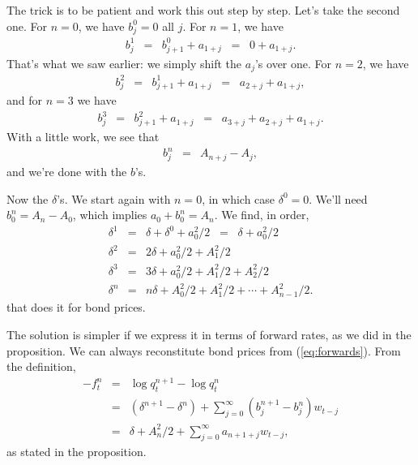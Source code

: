 \documentclass[11pt]{article}
\begin{document}
The trick is to be patient and work this out step by step.
Let's take the second one.
For $n = 0$,  we have $b^0_j = 0$ all $j$.
For $n=1$, we have
\begin{eqnarray*}
    b^1_j &=& b^0_{j+1} + a_{1+j}
            \;\;=\;\; 0 + a_{1+j}.
\end{eqnarray*}
That's what we saw earlier:  we simply shift the $a_j$'s over one.
For $n=2$, we have
\begin{eqnarray*}
    b^2_j &=& b^1_{j+1} + a_{1+j}
            \;\;=\;\; a_{2+j} + a_{1+j} ,
\end{eqnarray*}
and for $n=3$ we have
\begin{eqnarray*}
    b^3_j &=& b^2_{j+1} + a_{1+j}
            \;\;=\;\; a_{3+j} + a_{2+j} + a_{1+j} .
\end{eqnarray*}
With a little work, we see that
\begin{eqnarray*}
    b^n_j &=& A_{n+j} - A_j  ,
\end{eqnarray*}
and we're done with the $b$'s.

Now the $\delta$'s.
We start again with $n=0$, in which case $\delta^0 = 0$.
We'll need $b^n_0 = A_{n} - A_0 $,
which implies $a_0 + b^n_0 = A_n$.
We find, in order,
\begin{eqnarray*}
    \delta^1 &=& \delta + \delta^0 + a_0^2/2
            \;\;=\;\; \delta + a_0^2/2 \\
    \delta^2 &=& 2 \delta + a_0^2/2 + A_1^2/2 \\
    \delta^3 &=& 3 \delta + a_0^2/2 + A_1^2/2 + A_2^2/2\\
    \delta^n &=& n \delta + A_0^2/2 + A_1^2/2 + \cdots + A_{n-1}^2/2 .
\end{eqnarray*}
that does it for bond prices.

The solution is simpler if we express it in terms of forward rates,
as we did in the proposition.
We can always reconstitute bond prices from (\ref{eq:forwards}).
From the definition,
\begin{eqnarray*}
    - f^n_t &=& \log q^{n+1}_t - \log q^n_t \\
            &=& (\delta^{n+1} - \delta^n) + \sum_{j=0}^\infty
                    (b^{n+1}_j - b^n_j) w_{t-j} \\
            &=&  \delta + A_n^2/2 + \sum_{j=0}^\infty
                    a_{n+1+j} w_{t-j}  ,
\end{eqnarray*}
as stated in the proposition.
\end{document}
